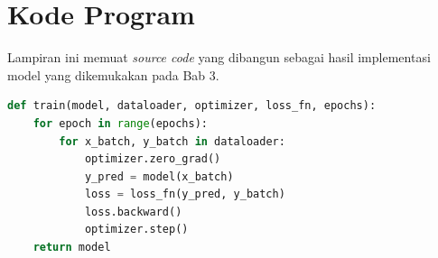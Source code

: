 \chapter{Kode Program}

Lampiran ini memuat \textit{source code} yang dibangun sebagai hasil implementasi model yang dikemukakan pada Bab 3.

\begin{lstlisting}[language=Python, basicstyle=\ttfamily\small, breaklines=true, frame=single, caption={Contoh cuplikan kode pelatihan model}]
def train(model, dataloader, optimizer, loss_fn, epochs):
    for epoch in range(epochs):
        for x_batch, y_batch in dataloader:
            optimizer.zero_grad()
            y_pred = model(x_batch)
            loss = loss_fn(y_pred, y_batch)
            loss.backward()
            optimizer.step()
    return model
\end{lstlisting}

